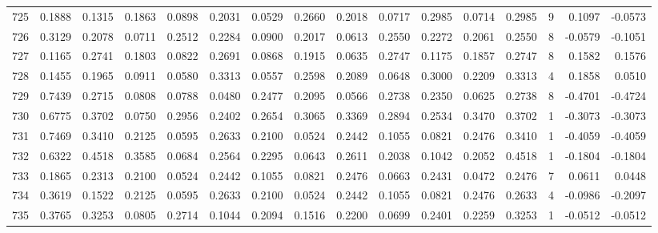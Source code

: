 \begin{tabular}{lrrrrrrrrrrrrrrr}
725 &      0.1888 &  0.1315 &  0.1863 &  0.0898 &  0.2031 &  0.0529 &  0.2660 &  0.2018 &  0.0717 &  0.2985 &   0.0714 &     0.2985 &      9 &                    0.1097 &                    -0.0573 \\
726 &      0.3129 &  0.2078 &  0.0711 &  0.2512 &  0.2284 &  0.0900 &  0.2017 &  0.0613 &  0.2550 &  0.2272 &   0.2061 &     0.2550 &      8 &                   -0.0579 &                    -0.1051 \\
727 &      0.1165 &  0.2741 &  0.1803 &  0.0822 &  0.2691 &  0.0868 &  0.1915 &  0.0635 &  0.2747 &  0.1175 &   0.1857 &     0.2747 &      8 &                    0.1582 &                     0.1576 \\
728 &      0.1455 &  0.1965 &  0.0911 &  0.0580 &  0.3313 &  0.0557 &  0.2598 &  0.2089 &  0.0648 &  0.3000 &   0.2209 &     0.3313 &      4 &                    0.1858 &                     0.0510 \\
729 &      0.7439 &  0.2715 &  0.0808 &  0.0788 &  0.0480 &  0.2477 &  0.2095 &  0.0566 &  0.2738 &  0.2350 &   0.0625 &     0.2738 &      8 &                   -0.4701 &                    -0.4724 \\
730 &      0.6775 &  0.3702 &  0.0750 &  0.2956 &  0.2402 &  0.2654 &  0.3065 &  0.3369 &  0.2894 &  0.2534 &   0.3470 &     0.3702 &      1 &                   -0.3073 &                    -0.3073 \\
731 &      0.7469 &  0.3410 &  0.2125 &  0.0595 &  0.2633 &  0.2100 &  0.0524 &  0.2442 &  0.1055 &  0.0821 &   0.2476 &     0.3410 &      1 &                   -0.4059 &                    -0.4059 \\
732 &      0.6322 &  0.4518 &  0.3585 &  0.0684 &  0.2564 &  0.2295 &  0.0643 &  0.2611 &  0.2038 &  0.1042 &   0.2052 &     0.4518 &      1 &                   -0.1804 &                    -0.1804 \\
733 &      0.1865 &  0.2313 &  0.2100 &  0.0524 &  0.2442 &  0.1055 &  0.0821 &  0.2476 &  0.0663 &  0.2431 &   0.0472 &     0.2476 &      7 &                    0.0611 &                     0.0448 \\
734 &      0.3619 &  0.1522 &  0.2125 &  0.0595 &  0.2633 &  0.2100 &  0.0524 &  0.2442 &  0.1055 &  0.0821 &   0.2476 &     0.2633 &      4 &                   -0.0986 &                    -0.2097 \\
735 &      0.3765 &  0.3253 &  0.0805 &  0.2714 &  0.1044 &  0.2094 &  0.1516 &  0.2200 &  0.0699 &  0.2401 &   0.2259 &     0.3253 &      1 &                   -0.0512 &                    -0.0512 \\

\end{tabular}
